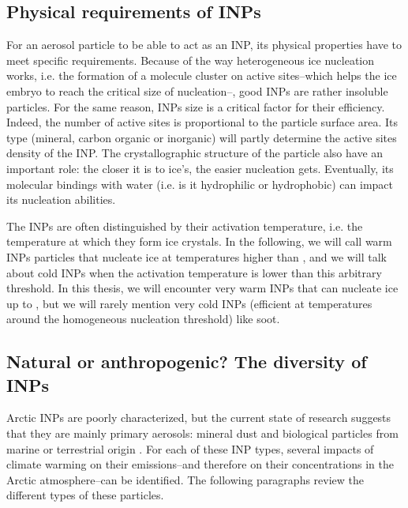     \subsection{Physical requirements of INPs}
     For an aerosol particle to be able to act as an INP, its physical properties have to meet specific requirements.
     Because of the way heterogeneous ice nucleation works, i.e. the formation of a molecule cluster on active sites\---which helps the ice embryo to reach the critical size of nucleation\---, good INPs are rather insoluble particles. 
     For the same reason, INPs size is a critical factor for their efficiency. Indeed, the number of active sites is proportional to the particle surface area. Its type (mineral, carbon organic or inorganic) will partly determine the active sites density of the INP.
     The crystallographic structure of the particle also have an important role: the closer it is to ice's, the easier nucleation gets.
     Eventually, its molecular bindings with water (i.e. is it hydrophilic or hydrophobic) can impact its nucleation abilities.

     The INPs are often distinguished by their activation temperature, i.e. the temperature at which they form ice crystals. In the following, we will call warm INPs particles that nucleate ice at temperatures higher than , and we will talk about cold INPs when the activation temperature is lower than this arbitrary threshold.
     In this thesis, we will encounter very warm INPs that can nucleate ice up to , but we will rarely mention very cold INPs (efficient at temperatures around the homogeneous nucleation threshold) like soot.



    \subsection{Natural or anthropogenic? The diversity of INPs}
    \label{sec:INP_types}
    Arctic INPs are poorly characterized, but the current state of research suggests that they are mainly primary aerosols: mineral dust and biological particles from marine or terrestrial origin \citep{creamean_marine_2018, hartmann_terrestrial_2021}. 
    For each of these INP types, several impacts of climate warming on their emissions\---and therefore on their concentrations in the Arctic atmosphere\---can be identified.
    The following paragraphs review the different types of these particles.
    
